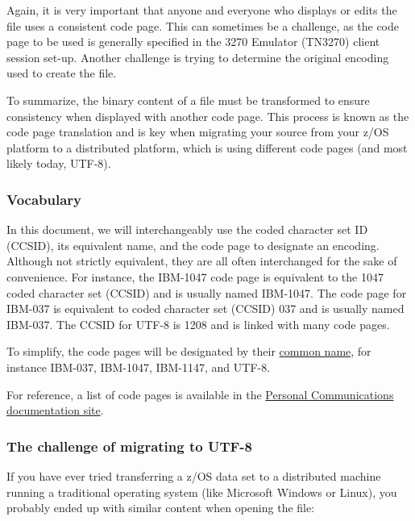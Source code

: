 \documentclass[
  letterpaper,
  DIV=11,
  numbers=noendperiod]{scrartcl}
\begin{document}
Again, it is very important that anyone and everyone who displays or
edits the file uses a consistent code page. This can sometimes be a
challenge, as the code page to be used is generally specified in the
3270 Emulator (TN3270) client session set-up. Another challenge is
trying to determine the original encoding used to create the file.

To summarize, the binary content of a file must be transformed to ensure
consistency when displayed with another code page. This process is known
as the code page translation and is key when migrating your source from
your z/OS platform to a distributed platform, which is using different
code pages (and most likely today, UTF-8).

\hypertarget{vocabulary}{%
\subsubsection{Vocabulary}\label{vocabulary}}

In this document, we will interchangeably use the coded character set ID
(CCSID), its equivalent name, and the code page to designate an
encoding. Although not strictly equivalent, they are all often
interchanged for the sake of convenience. For instance, the IBM-1047
code page is equivalent to the 1047 coded character set (CCSID) and is
usually named IBM-1047. The code page for IBM-037 is equivalent to coded
character set (CCSID) 037 and is usually named IBM-037. The CCSID for
UTF-8 is 1208 and is linked with many code pages.

To simplify, the code pages will be designated by their
\href{https://www.ibm.com/docs/en/zos-connect/zosconnect/3.0?topic=properties-coded-character-set-identifiers}{common
name}, for instance IBM-037, IBM-1047, IBM-1147, and UTF-8.

For reference, a list of code pages is available in the
\href{https://www.ibm.com/docs/en/personal-communications/14.0?topic=SSEQ5Y_14.0.0/com.ibm.pcomm.doc/reference/html/hcp_referencet002.htm}{Personal
Communications documentation site}.

\hypertarget{the-challenge-of-migrating-to-utf-8}{%
\subsubsection{The challenge of migrating to
UTF-8}\label{the-challenge-of-migrating-to-utf-8}}

If you have ever tried transferring a z/OS data set to a distributed
machine running a traditional operating system (like Microsoft Windows
or Linux), you probably ended up with similar content when opening the
file:
\end{document}
